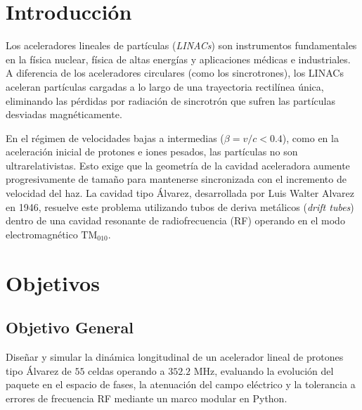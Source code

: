 
\chapter*{Introducción}
Los aceleradores lineales de partículas (\textit{LINACs}) son instrumentos fundamentales en la física nuclear, física de altas energías y aplicaciones médicas e industriales. A diferencia de los aceleradores circulares (como los sincrotrones), los LINACs aceleran partículas cargadas a lo largo de una trayectoria rectilínea única, eliminando las pérdidas por radiación de sincrotrón que sufren las partículas desviadas magnéticamente.

En el régimen de velocidades bajas a intermedias ($\beta = v/c < 0.4$), como en la aceleración inicial de protones e iones pesados, las partículas no son ultrarelativistas. Esto exige que la geometría de la cavidad aceleradora aumente progresivamente de tamaño para mantenerse sincronizada con el incremento de velocidad del haz. La cavidad tipo Álvarez, desarrollada por Luis Walter Alvarez en 1946, resuelve este problema utilizando tubos de deriva metálicos (\textit{drift tubes}) dentro de una cavidad resonante de radiofrecuencia (RF) operando en el modo electromagnético $\text{TM}_{010}$.



\chapter*{Objetivos}

\section*{Objetivo General}
Diseñar y simular la dinámica longitudinal de un acelerador lineal de protones tipo Álvarez de $55$ celdas operando a $352.2\text{ MHz}$, evaluando la evolución del paquete en el espacio de fases, la atenuación del campo eléctrico y la tolerancia a errores de frecuencia RF mediante un marco modular en Python.

